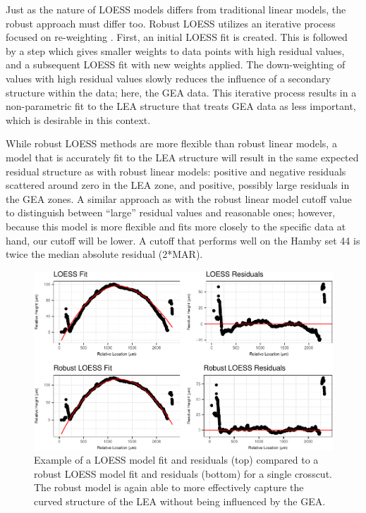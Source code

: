 \documentclass[12pt]{article}
\begin{document}
Just as the nature of LOESS models differs from traditional linear
models, the robust approach must differ too. Robust LOESS utilizes an
iterative process focused on re-weighting \citep[see][]{Cleveland1}.
First, an initial LOESS fit is created. This is followed by a step which
gives smaller weights to data points with high residual values, and a
subsequent LOESS fit with new weights applied. The down-weighting of
values with high residual values slowly reduces the influence of a
secondary structure within the data; here, the GEA data. This iterative
process results in a non-parametric fit to the LEA structure that treats
GEA data as less important, which is desirable in this context.

While robust LOESS methods are more flexible than robust linear models,
a model that is accurately fit to the LEA structure will result in the
same expected residual structure as with robust linear models: positive
and negative residuals scattered around zero in the LEA zone, and
positive, possibly large residuals in the GEA zones. A similar approach
as with the robust linear model cutoff value to distinguish between
``large'' residual values and reasonable ones; however, because this
model is more flexible and fits more closely to the specific data at
hand, our cutoff will be lower. A cutoff that performs well on the Hamby
set 44 is twice the median absolute residual (2*MAR).

\begin{figure}[htbp]
\centering
\includegraphics{writeup_files/figure-latex/unnamed-chunk-4-1.pdf}
\caption{Example of a LOESS model fit and residuals (top) compared to a
robust LOESS model fit and residuals (bottom) for a single crosscut. The
robust model is again able to more effectively capture the curved
structure of the LEA without being influenced by the GEA.}
\end{figure}
\end{document}

